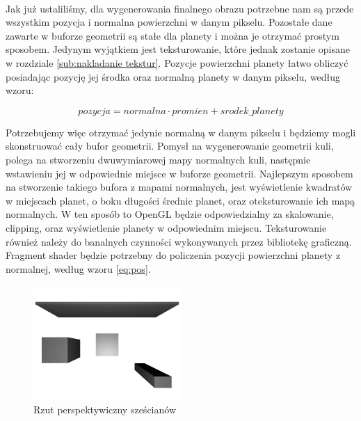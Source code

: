 \paragraph{}

Jak już ustaliliśmy, dla wygenerowania finalnego obrazu potrzebne nam są przede wszystkim pozycja i normalna powierzchni w danym pikselu. Pozostałe dane zawarte w buforze geometrii są stałe dla planety i można je otrzymać prostym sposobem. Jedynym wyjątkiem jest teksturowanie, które jednak zostanie opisane w rozdziale \hyperref[sub:nakladanie tekstur]{\ref{sub:nakladanie tekstur}}. Pozycje powierzchni planety łatwo obliczyć posiadając pozycję jej środka oraz normalną planety w danym pikselu, według wzoru:

\begin{equation} \label{eq:pos}
pozycja = normalna \cdot promien + srodek\_planety
\end{equation}

Potrzebujemy więc otrzymać jedynie normalną w danym pikselu i będziemy mogli skonstruować cały bufor geometrii. Pomysł na wygenerowanie geometrii kuli, polega na stworzeniu dwuwymiarowej mapy normalnych kuli, następnie wstawieniu jej w odpowiednie miejsce w buforze geometrii. Najlepszym sposobem na stworzenie takiego bufora z mapami normalnych, jest wyświetlenie kwadratów w miejscach planet, o boku długości średnic planet, oraz oteksturowanie ich mapą normalnych. W ten sposób to OpenGL będzie odpowiedzialny za skalowanie, clipping, oraz wyświetlenie planety w odpowiednim miejscu. Teksturowanie również należy do banalnych czynności wykonywanych przez bibliotekę graficzną. Fragment shader będzie potrzebny do policzenia pozycji powierzchni planety z normalnej, według wzoru \hyperref[eq:pos]{\ref{eq:pos}}.

\paragraph{}

\begin{figure}
\centering
	\includegraphics[width=0.5\textwidth]{img/proj_rend.jpg}
\caption{Rzut perspektywiczny sześcianów}
\label{fig:proj}
\end{figure}

